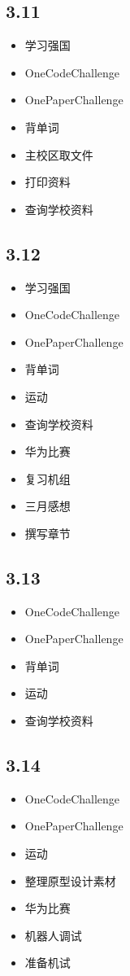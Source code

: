 \documentclass[UTF8]{ctexart}
\begin{document}
\subsection*{3.11}
\begin{itemize}
    \item 学习强国
    \item OneCodeChallenge
    \item OnePaperChallenge
    \item 背单词
    \item 主校区取文件
    \item 打印资料
    \item 查询学校资料
\end{itemize}

\subsection*{3.12}
\begin{itemize}
    \item 学习强国
    \item OneCodeChallenge
    \item OnePaperChallenge
    \item 背单词
    \item 运动
    \item 查询学校资料
    \item 华为比赛
    \item 复习机组
    \item 三月感想
    \item 撰写章节
\end{itemize}

\subsection*{3.13}
\begin{itemize}
    \item OneCodeChallenge
    \item OnePaperChallenge
    \item 背单词
    \item 运动
    \item 查询学校资料
\end{itemize}

\subsection*{3.14}
\begin{itemize}
    \item OneCodeChallenge
    \item OnePaperChallenge
    \item 运动
    \item 整理原型设计素材
    \item 华为比赛
    \item 机器人调试
    \item 准备机试
\end{itemize}
\end{document}
